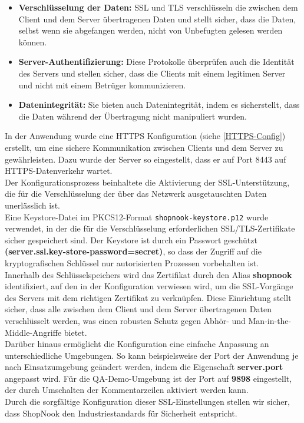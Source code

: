 \begin{itemize}
	\item \textbf{Verschlüsselung der Daten:} SSL und TLS verschlüsseln die zwischen dem Client und dem Server übertragenen Daten und stellt sicher, dass die Daten, selbst wenn sie abgefangen werden, nicht von Unbefugten gelesen werden können.
	\item \textbf{Server-Authentifizierung:} Diese Protokolle überprüfen auch die Identität des Servers und stellen sicher, dass die Clients mit einem legitimen Server und nicht mit einem Betrüger kommunizieren.
	\item \textbf{Datenintegrität:} Sie bieten auch Datenintegrität, indem es sicherstellt, dass die Daten während der Übertragung nicht manipuliert wurden.
\end{itemize}
In der Anwendung wurde eine HTTPS Konfiguration (siehe \ref{HTTPS-Config}) erstellt, um eine sichere Kommunikation zwischen Clients und dem Server zu gewährleisten. Dazu wurde der Server so eingestellt, dass er auf Port 8443 auf HTTPS-Datenverkehr wartet.\\
Der Konfigurationsprozess beinhaltete die Aktivierung der SSL-Unterstützung, die für die Verschlüsselung der über das Netzwerk ausgetauschten Daten unerlässlich ist.\\
Eine Keystore-Datei im PKCS12-Format \verb*|shopnook-keystore.p12| wurde verwendet, in der die für die Verschlüsselung erforderlichen SSL/TLS-Zertifikate sicher gespeichert sind. Der Keystore ist durch ein Passwort geschützt \textbf{(server.ssl.key-store-password=secret)}, so dass der Zugriff auf die kryptografischen Schlüssel nur autorisierten Prozessen vorbehalten ist. \\ 
Innerhalb des Schlüsselspeichers wird das Zertifikat durch den Alias \textbf{shopnook} identifiziert, auf den in der Konfiguration verwiesen wird, um die SSL-Vorgänge des Servers mit dem richtigen Zertifikat zu verknüpfen. Diese Einrichtung stellt sicher, dass alle zwischen dem Client und dem Server übertragenen Daten verschlüsselt werden, was einen robusten Schutz gegen Abhör- und Man-in-the-Middle-Angriffe bietet.\\
Darüber hinaus ermöglicht die Konfiguration eine einfache Anpassung an unterschiedliche Umgebungen. So kann beispielsweise der Port der Anwendung je nach Einsatzumgebung geändert werden, indem die Eigenschaft \textbf{server.port} angepasst wird. Für die QA-Demo-Umgebung ist der Port auf \textbf{9898} eingestellt, der durch Umschalten der Kommentarzeilen aktiviert werden kann.\\
Durch die sorgfältige Konfiguration dieser SSL-Einstellungen stellen wir sicher, dass ShopNook den Industriestandards für Sicherheit entspricht.

